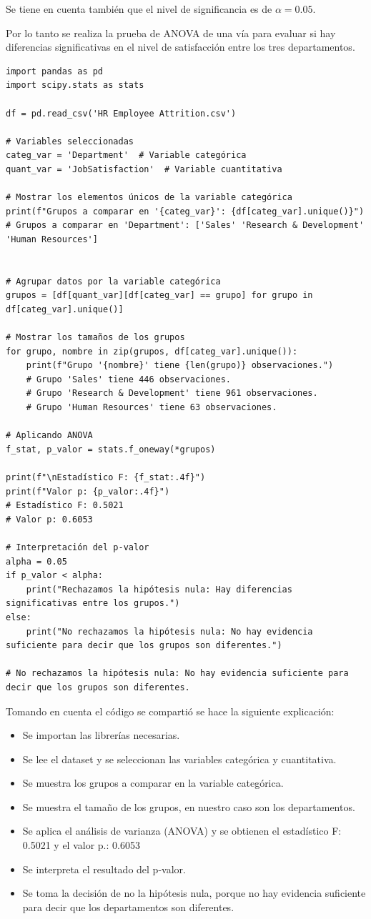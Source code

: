 Se tiene en cuenta también que el nivel de significancia es de \(\alpha=0.05.\)

Por lo tanto se realiza la prueba de ANOVA de una vía para evaluar si hay diferencias significativas 
en el nivel de satisfacción entre los tres departamentos.

\begin{verbatim}
import pandas as pd
import scipy.stats as stats

df = pd.read_csv('HR Employee Attrition.csv')

# Variables seleccionadas
categ_var = 'Department'  # Variable categórica
quant_var = 'JobSatisfaction'  # Variable cuantitativa

# Mostrar los elementos únicos de la variable categórica
print(f"Grupos a comparar en '{categ_var}': {df[categ_var].unique()}")
# Grupos a comparar en 'Department': ['Sales' 'Research & Development' 'Human Resources']


# Agrupar datos por la variable categórica
grupos = [df[quant_var][df[categ_var] == grupo] for grupo in df[categ_var].unique()]

# Mostrar los tamaños de los grupos
for grupo, nombre in zip(grupos, df[categ_var].unique()):
    print(f"Grupo '{nombre}' tiene {len(grupo)} observaciones.")
    # Grupo 'Sales' tiene 446 observaciones.
    # Grupo 'Research & Development' tiene 961 observaciones.
    # Grupo 'Human Resources' tiene 63 observaciones.

# Aplicando ANOVA
f_stat, p_valor = stats.f_oneway(*grupos)

print(f"\nEstadístico F: {f_stat:.4f}")
print(f"Valor p: {p_valor:.4f}")
# Estadístico F: 0.5021
# Valor p: 0.6053

# Interpretación del p-valor
alpha = 0.05
if p_valor < alpha:
    print("Rechazamos la hipótesis nula: Hay diferencias significativas entre los grupos.")
else:
    print("No rechazamos la hipótesis nula: No hay evidencia suficiente para decir que los grupos son diferentes.")

# No rechazamos la hipótesis nula: No hay evidencia suficiente para decir que los grupos son diferentes.
\end{verbatim}

Tomando en cuenta el código se compartió se hace la siguiente explicación:
\begin{itemize}
    \item Se importan las librerías necesarias.
    \item Se lee el dataset y se seleccionan las variables categórica y cuantitativa.
    \item Se muestra los grupos a comparar en la variable categórica.
    \item Se muestra el tamaño de los grupos, en nuestro caso son los departamentos.
    \item Se aplica el análisis de varianza (ANOVA) y se obtienen el estadístico F: 0.5021 y el valor p.: 0.6053 
    \item Se interpreta el resultado del p-valor.
    \item Se toma la decisión de no la hipótesis nula, porque no hay evidencia suficiente para decir que los 
    departamentos son diferentes.  
\end{itemize}

